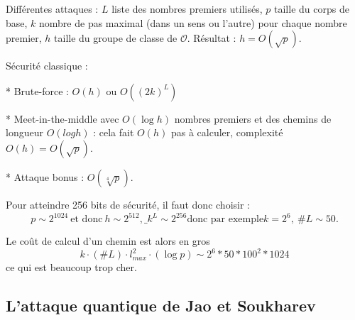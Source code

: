 \documentclass[11pt,a4paper]{article}
\renewcommand{\O}{\mathcal{O}}
\theoremstyle{definition}
\begin{document}
Différentes attaques :
$L$ liste des nombres premiers utilisés, $p$ taille du corps de base, $k$ nombre de pas maximal (dans un sens ou l'autre) pour chaque nombre premier, $h$ taille du groupe de classe de $\O$. Résultat : $h=O(\sqrt{p})$.

Sécurité classique :

* Brute-force : $O(h)$ ou $O((2k)^L)$

* Meet-in-the-middle avec $O(\log h)$ nombres premiers et des chemins de longueur $O(log h)$ : cela fait $O(h)$ pas à calculer, complexité $O(h)=O(\sqrt{p})$.

* Attaque bonus : $O(\sqrt[4]{p})$.

Pour atteindre 256 bits de sécurité, il faut donc choisir :
$$p\sim 2^{1024}\ \text{et donc}\ h\sim 2^{512},\_ k^L\sim 2^{256} \text{donc par exemple} k=2^6,\ \#L\sim 50.$$

Le coût de calcul d'un chemin est alors en gros
$$k\cdot(\#L)\cdot l_{max}^2\cdot (\log p)\sim 2^6*50*100^2*1024$$
ce qui est beaucoup trop cher.

\subsection{L'attaque quantique de Jao et Soukharev}




\newpage

\nocite{*}




\end{document}
